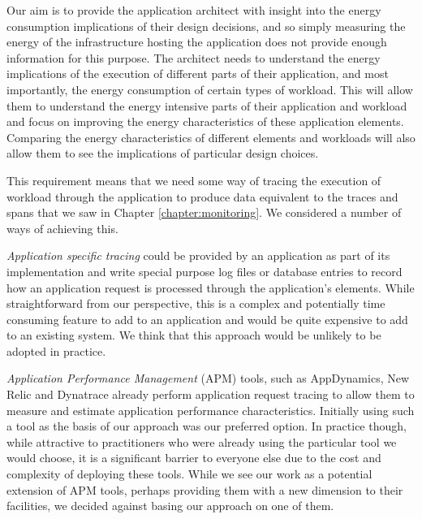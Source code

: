 Our aim is to provide the application architect with insight into the energy consumption implications of their design decisions, and so simply measuring the energy of the infrastructure hosting the application does not provide enough information for this purpose.  The architect needs to understand the energy implications of the execution of different parts of their application, and most importantly, the energy consumption of certain types of workload.  This will allow them to understand the energy intensive parts of their application and workload and focus on improving the energy characteristics of these application elements.  Comparing the energy characteristics of different elements and workloads will also allow them to see the implications of particular design choices.

This requirement means that we need some way of tracing the execution of workload through the application to produce data equivalent to the traces and spans that we saw in Chapter \ref{chapter:monitoring}.  We considered a number of ways of achieving this.

\emph{Application specific tracing} could be provided by an application as part of its implementation and write special purpose log files or database entries to record how an application request is processed through the application's elements.  While straightforward from our perspective, this is a complex and potentially time consuming feature to add to an application and would be quite expensive to add to an existing system.  We think that this approach would be unlikely to be adopted in practice.

\emph{Application Performance Management} (APM) tools, such as AppDynamics, New Relic and Dynatrace \cite{appdynamics2018, newrelic2018, dynatrace2018} already perform application request tracing to allow them to measure and estimate application performance characteristics.  Initially using such a tool as the basis of our approach was our preferred option.  In practice though, while attractive to practitioners who were already using the particular tool we would choose, it is a significant barrier to everyone else due to the cost and complexity of deploying these tools.  While we see our work as a potential extension of APM tools, perhaps providing them with a new dimension to their facilities, we decided against basing our approach on one of them.

